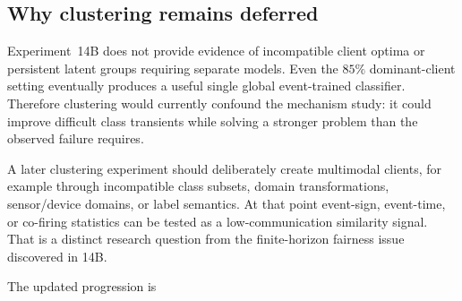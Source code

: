 \subsection{Why clustering remains deferred}

Experiment~14B does not provide evidence of incompatible client optima or persistent latent groups requiring separate models. Even the $85\%$ dominant-client setting eventually produces a useful single global event-trained classifier. Therefore clustering would currently confound the mechanism study: it could improve difficult class transients while solving a stronger problem than the observed failure requires.

A later clustering experiment should deliberately create multimodal clients, for example through incompatible class subsets, domain transformations, sensor/device domains, or label semantics. At that point event-sign, event-time, or co-firing statistics can be tested as a low-communication similarity signal. That is a distinct research question from the finite-horizon fairness issue discovered in 14B.

The updated progression is
\begin{center}
\end{center}
